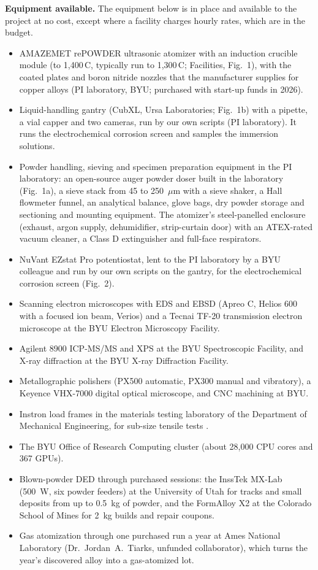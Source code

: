 \textbf{Equipment available.} The equipment below is in place and available
to the project at no cost, except where a facility charges hourly rates,
which are in the budget.
\begin{itemize}\setlength{\itemsep}{0pt}\setlength{\topsep}{2pt}
\item AMAZEMET rePOWDER ultrasonic atomizer with an induction crucible module
(to 1,400\,\textdegree{}C, typically run to 1,300\,\textdegree{}C;
Facilities, Fig.~1), with the coated plates and boron nitride nozzles that
the manufacturer supplies for copper alloys (PI laboratory, BYU; purchased
with start-up funds in 2026).
\item Liquid-handling gantry (CubXL, Ursa Laboratories; Fig.~1b) with a
pipette, a vial capper and two cameras, run by our own scripts (PI
laboratory). It runs the electrochemical corrosion screen and samples the
immersion solutions.
\item Powder handling, sieving and specimen preparation equipment in the PI
laboratory: an open-source auger powder doser built in the laboratory
(Fig.~1a), a sieve stack from 45 to 250~$\mu$m with a sieve shaker, a Hall
flowmeter funnel, an analytical balance, glove bags, dry powder storage and
sectioning and mounting equipment. The atomizer's steel-panelled enclosure
(exhaust, argon supply, dehumidifier, strip-curtain door) with an ATEX-rated
vacuum cleaner, a Class D extinguisher and full-face respirators.
\item NuVant EZstat Pro potentiostat, lent to the PI laboratory by a BYU
colleague and run by our own scripts on the gantry, for the electrochemical
corrosion screen (Fig.~2).
\item Scanning electron microscopes with EDS and EBSD (Apreo C, Helios 600
with a focused ion beam, Verios) and a Tecnai TF-20 transmission electron
microscope at the BYU Electron Microscopy Facility.
\item Agilent 8900 ICP-MS/MS and XPS at the BYU Spectroscopic Facility, and
X-ray diffraction at the BYU X-ray Diffraction Facility.
\item Metallographic polishers (PX500 automatic, PX300 manual and
vibratory), a Keyence VHX-7000 digital optical microscope, and CNC machining
at BYU.
\item Instron load frames in the materials testing laboratory of the
Department of Mechanical Engineering, for sub-size tensile tests
.
\item The BYU Office of Research Computing cluster (about 28,000 CPU cores
and 367 GPUs).
\item Blown-powder DED through purchased sessions: the InssTek MX-Lab (500~W,
six powder feeders) at the University of Utah for tracks and small deposits
from up to 0.5~kg of powder, and the FormAlloy X2 at the Colorado School of
Mines for 2~kg builds and repair coupons.
\item Gas atomization through one purchased run a year at Ames National
Laboratory (Dr.~Jordan~A.~Tiarks, unfunded collaborator), which turns the
year's discovered alloy into a gas-atomized lot.
\end{itemize}

